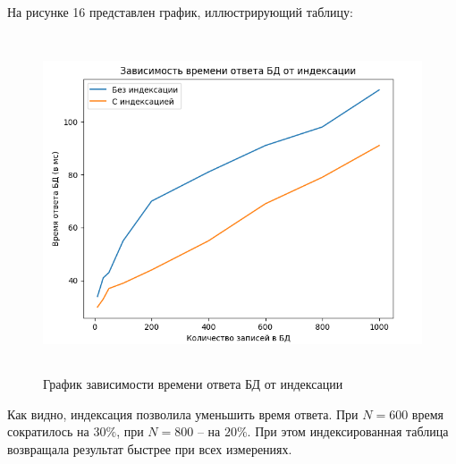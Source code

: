 На рисунке 16 представлен график, иллюстрирующий таблицу:
\FloatBarrier
\begin{figure}[h]	
	\begin{center}
		\includegraphics[height=10cm, width=\linewidth]{inc/graph.png}
	\end{center}
	\caption{График зависимости времени ответа БД от индексации}
\end{figure}
\FloatBarrier

Как видно, индексация позволила уменьшить время ответа. При $N=600$ время сократилось на $30\%$, при $N=800$ -- на $20\%$. При этом индексированная таблица возвращала результат быстрее при всех измерениях.